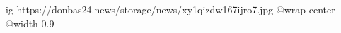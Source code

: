  
 
 
 
 

\ifcmt
  ig https://donbas24.news/storage/news/xy1qizdw167ijro7.jpg
  @wrap center
  @width 0.9
\fi
